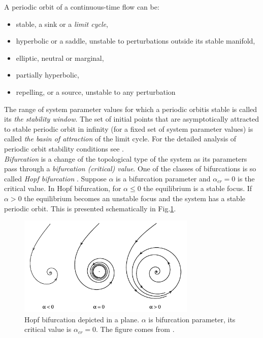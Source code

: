 \documentclass[../main.tex]{subfiles}
\begin{document}
A periodic orbit of a continuous-time flow can be:
\begin{itemize}
\item stable, a sink or a \emph{limit cycle}, 
\item hyperbolic or a saddle, unstable to perturbations outside its stable manifold,
\item elliptic, neutral or marginal,
\item partially hyperbolic,
\item repelling, or a source, unstable to any perturbation
\end{itemize}
The range of system parameter values for which a periodic orbitis stable is called its \emph{the stability window}. The set of initial points that are asymptotically attracted to stable periodic orbit in infinity (for a fixed set of system parameter values) is called \emph{the basin of attraction} of the limit cycle. For the detailed analysis of periodic orbit stability conditions see \citep{ChaosBook}.\\
\emph{Bifurcation} is a change of the topological type of the system as its parameters pass through a \emph{bifurcation (critical) value}. One of the classes of bifurcations is so called \emph{Hopf bifurcation} \citep{Kuznetsov2004}. Suppose $\alpha$ is a bifurcation parameter and $\alpha_{cr}=0$ is the critical value. In Hopf bifurcation, for $\alpha \leq 0$ the equilibrium is a stable focus. If $\alpha > 0$ the equilibrium becomes an unstable focus and the system has a stable periodic orbit. This is presented schematically in Fig.\ref{fig:ch2_04}.

\begin{figure}
\centering
\noindent \includegraphics[width=20pc]{gfx/Hopf_bifur.png}
\caption{Hopf bifurcation depicted in a plane. $\alpha$ is bifurcation parameter, its critical value is $\alpha_{cr}=0$. The figure comes from \citep{Kuznetsov2004}.}
\label{fig:ch2_04}
\end{figure}
\end{document}
